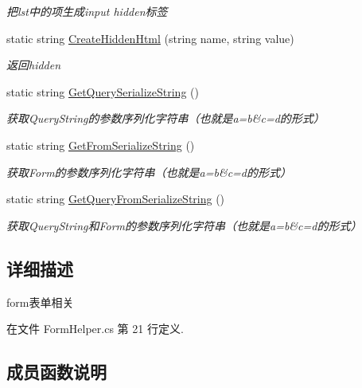 \begin{DoxyCompactItemize}
\begin{DoxyCompactList}\small\item\em 把lst中的项生成input hidden标签 \end{DoxyCompactList}\item 
static string \hyperlink{class_x_c_l_net_tools_1_1_string_hander_1_1_form_helper_a3df398dd109cfe76da34602149d16410}{Create\+Hidden\+Html} (string name, string value)
\begin{DoxyCompactList}\small\item\em 返回hidden \end{DoxyCompactList}\item 
static string \hyperlink{class_x_c_l_net_tools_1_1_string_hander_1_1_form_helper_ab3d6c0e951ba151fe5efc423854bbff4}{Get\+Query\+Serialize\+String} ()
\begin{DoxyCompactList}\small\item\em 获取\+Query\+String的参数序列化字符串（也就是a=b\&c=d的形式） \end{DoxyCompactList}\item 
static string \hyperlink{class_x_c_l_net_tools_1_1_string_hander_1_1_form_helper_aa8048660a078480db6e41f2f3050c651}{Get\+From\+Serialize\+String} ()
\begin{DoxyCompactList}\small\item\em 获取\+Form的参数序列化字符串（也就是a=b\&c=d的形式） \end{DoxyCompactList}\item 
static string \hyperlink{class_x_c_l_net_tools_1_1_string_hander_1_1_form_helper_a9c3363c3f41771f044634f9e8050dc55}{Get\+Query\+From\+Serialize\+String} ()
\begin{DoxyCompactList}\small\item\em 获取\+Query\+String和\+Form的参数序列化字符串（也就是a=b\&c=d的形式） \end{DoxyCompactList}\end{DoxyCompactItemize}


\subsection{详细描述}
form表单相关 



在文件 Form\+Helper.\+cs 第 21 行定义.



\subsection{成员函数说明}
\mbox{\label{class_x_c_l_net_tools_1_1_string_hander_1_1_form_helper_ae6425dda60cd7288371433985e8edb00}} 

